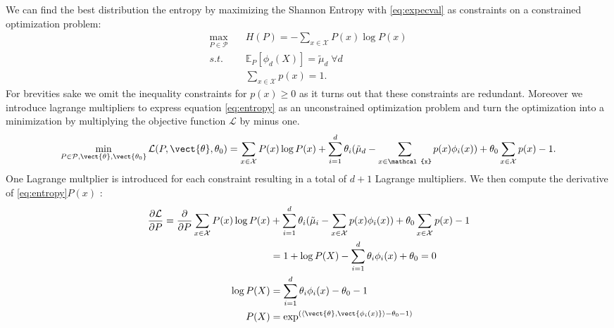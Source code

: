     We can find the best distribution \wrt the entropy by maximizing the Shannon Entropy with \eq\ref{eq:expecval} as constraints on a constrained optimization problem:
    \begin{equation}
        \label{eq:entropy}
        \begin{split}
            \max_{P\in \mathcal{P}} \quad & H(P) = - \sum_{x\in\mathcal{X}} P(x) \log P(x) \\
            s.t. \quad & \mathbb{E}_P[\phi_d(X)] = \tilde{\mu}_d  \; \forall d\\
            & \sum_{x\in \mathcal{X}} p(x) = 1.
        \end{split}
    \end{equation}
    For brevities sake we omit the inequality constraints for $p(x) \geq 0$ as it turns out that these constraints are redundant. 
    Moreover we introduce lagrange multipliers to express equation \ref{eq:entropy} as an unconstrained optimization problem and turn the optimization into a minimization by multiplying the objective function $\mathcal{L}$ by minus one.
    \begin{equation}
        \min_{P\in \mathcal{P}, \vect{\theta}, \vect{\theta_0} } \mathcal{L}(P, \vect{\theta}, \theta_0) = \sum_{x\in\mathcal{X}} P(x) \log P(x) + \sum_{i=1}^d \theta_i (\tilde{\mu}_d - \sum_{x \in \mathcal{x}} p(x) \phi_i(x)) + \theta_0 \sum_{x\in\mathcal{X}} p(x) -1.
    \end{equation}
    One Lagrange multplier is introduced for each constraint resulting in a total of $d+1$ Lagrange multipliers.
    We then compute the derivative of \eq\ref{eq:entropy}\wrt $P(x)$ :
    \begin{equation}
        \begin{split}
        \frac{\partial \mathcal{L}}{\partial P} =  \frac{\partial}{\partial P} \sum_{x\in\mathcal{X}} P(x) \log P(x) &+ \sum_{i=1}^d \theta_i (\tilde{\mu}_i - \sum_{x \in \mathcal{X}} p(x) \phi_i(x)) + \theta_0 \sum_{x\in\mathcal{X}} p(x) -1 \\ 
        &= 1 + \log P(X) - \sum_{i=1}^d \theta_i  \phi_i(x) + \theta_0 = 0 \\
        \log P(X) &=  \sum_{i=1}^d \theta_i  \phi_i(x) - \theta_0 - 1 \\
        P(X) &= \exp^{(\langle\vect{\theta}, \vect{\phi_i(x)} \rangle - \theta_0 - 1)} \\
    \end{split}
    \end{equation}

